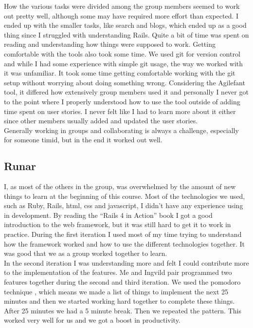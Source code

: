 \documentclass[a4paper]{article}
\begin{document}
\noindent
How the various tasks were divided among the group members seemed to work out pretty well, although some may have required more effort than expected. I ended up with the smaller tasks, like search and blogs, which ended up as a good thing since I struggled with understanding Rails. Quite a bit of time was spent on reading and understanding how things were supposed to work. Getting comfortable with the tools also took some time. We used git for version control and while I had some experience with simple git usage, the way we worked with it was unfamiliar. It took some time getting comfortable working with the git setup without worrying about doing something wrong. Considering the Agilefant tool, it differed how extensively group members used it and personally I never got to the point where I properly understood how to use the tool outside of adding time spent on user stories. I never felt like I had to learn more about it either since other members usually added and updated the user stories.\\

\noindent
Generally working in groups and collaborating is always a challenge, especially for someone timid, but in the end it worked out well.

\subsection{Runar}
I, as most of the others in the group, was overwhelmed by the amount of new things to learn at the beginning of this course. Most of the technologies we used, such as Ruby, Rails, html, css and javascript, I didn't have any experience using in development. By reading the ``Rails 4 in Action'' book \cite{railsaction} I got a good introduction to the web framework, but it was still hard to get it to work in practice. During the first iteration I used most of my time trying to understand how the framework worked and how to use the different technologies together. It was good that we as a group worked together to learn. \\

\noindent
In the second iteration I was understanding more and felt I could contribute more to the implementation of the features. Me and Ingvild pair programmed two features together during the second and third iteration. We used the pomodoro technique \cite{pomodoro}, which means we made a list of things to implement the next 25 minutes and then we started working hard together to complete these things. After 25 minutes we had a 5 minute break. Then we repeated the pattern. This worked very well for us and we got a boost in productivity.
\end{document}
